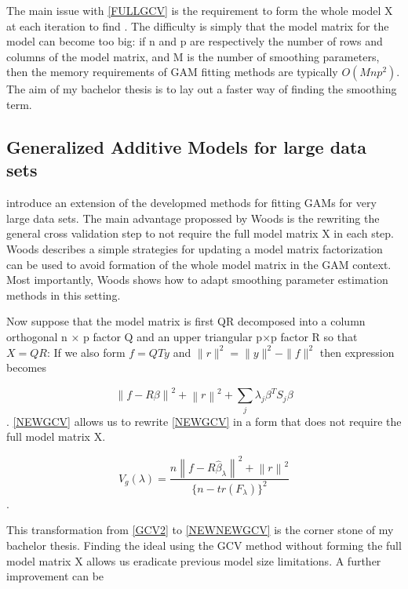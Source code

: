 \documentclass{article}
\begin{document}
    The main issue with \ref{FULLGCV} is the requirement to form the whole model X at each iteration to find \textlambda. The difficulty is simply that the model matrix for the model can become too big: if n and p are respectively the number of rows and columns of the model matrix, and M is the number of smoothing parameters, then the memory requirements of GAM fitting methods are typically $O(Mnp^2)$. The aim of my bachelor thesis is to lay out a faster way of finding the smoothing term.



    \subsection{Generalized Additive Models for large data sets}
    \cite{bigdataGAM} introduce an extension of the developmed methods for fitting GAMs for very large data sets. The main advantage propossed by Woods is the rewriting the general cross validation step to not require the full model matrix X in each step. Woods describes a  simple strategies for updating a model matrix factorization can be used to avoid formation of the whole model matrix in the GAM context. Most importantly, Woods shows how to adapt smoothing parameter estimation methods in this setting.

    Now suppose that the model matrix is first QR decomposed into a column orthogonal n × p factor Q and an upper triangular p×p factor R so that $X=QR$: If we also form $f =QTy$ and $∥r∥^2 = ∥y∥^2 − ∥f∥^2$ then expression \label{FINALSMOOTH} becomes

    \begin{equation} \label{NEWGCV} \left \| f- R\beta \right \|^2 + \left \| r \right \|^2 + \sum_{j}^{ } \lambda_j \beta^T S_j \beta \end{equation}. \ref{NEWGCV} allows us to rewrite \ref{NEWGCV} in a form that does not require the full model matrix X.

    \begin{equation} \label{NEWNEWGCV} V_g(\lambda) = \frac{n\left \| f-R\widehat{\beta}_\lambda \right \| ^2 + \left  \| r \right \| ^2}{\{n-tr(F_\lambda) \}^2} \end{equation}.

    This transformation from \ref{GCV2} to \ref{NEWNEWGCV} is the corner stone of my bachelor thesis. Finding the ideal \textlambda using the GCV method without forming the full model matrix X allows us eradicate previous model size limitations. A further improvement can be
\end{document}
